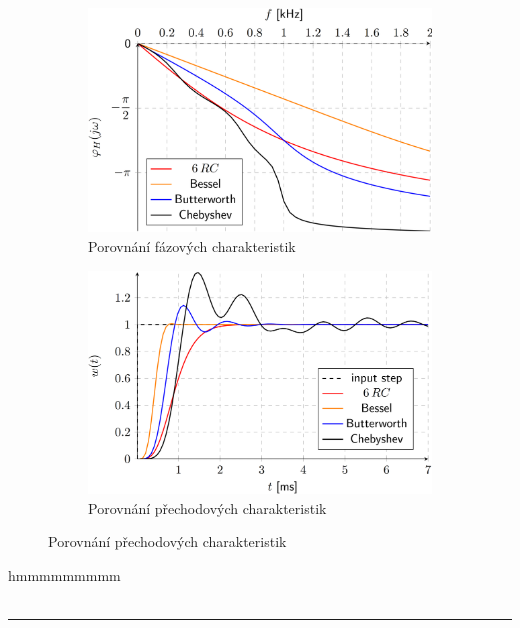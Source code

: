 \documentclass[a4paper,12pt]{article}   %
\begin{document}
\begin{figure}[H]
    \centering
    \begin{subfigure}{.49\textwidth}
        \centering
        \includegraphics[width=\textwidth]{faze-porovnani.PNG}
        \caption{Porovnání fázových charakteristik}
        \label{graf:faze:porovnani}
    \end{subfigure}
    \begin{subfigure}{.49\textwidth}
        \centering
        \includegraphics[width=\textwidth]{prechod-porovnani.PNG}
        \caption{Porovnání přechodových charakteristik}
        \label{graf:prechod:porovnani}
    \end{subfigure}
\end{figure}
hmmmmmmmmm\\
 \\
\hrule%
\end{document}
